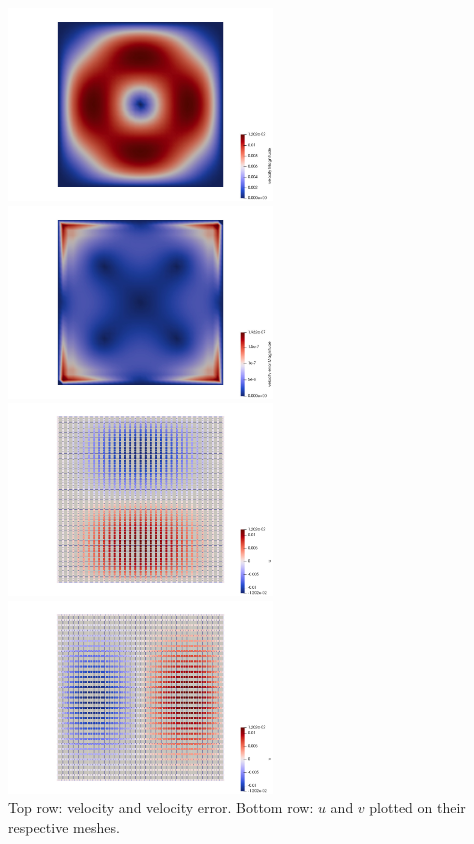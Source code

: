 \begin{center}
\includegraphics[width=7cm]{python_codes/fieldstone_80/results/dh/vel}
\includegraphics[width=7cm]{python_codes/fieldstone_80/results/dh/vel_error}\\
\includegraphics[width=7cm]{python_codes/fieldstone_80/results/dh/u_dofs}
\includegraphics[width=7cm]{python_codes/fieldstone_80/results/dh/v_dofs}\\
{\captionfont Top row: velocity and velocity error. Bottom row: $u$ and 
$v$ plotted on their respective meshes.}
\end{center}

